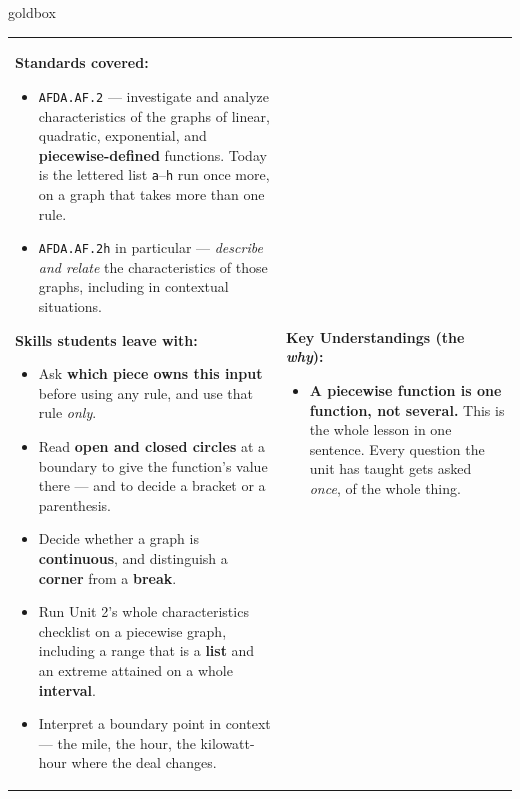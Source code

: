\documentclass[10pt]{article}
\begin{document}
\renewcommand{\arraystretch}{1.6}
\begin{skillbox}{goldbox}
\begin{tabularx}{\linewidth}{@{}X|X@{}}
\begin{minipage}[t]{\linewidth}\vspace{0pt}
\textbf{Standards covered:}
\begin{itemize}[leftmargin=1.1em, itemsep=2pt, topsep=2pt]
  \item \texttt{AFDA.AF.2} --- investigate and analyze characteristics of the graphs of linear,
        quadratic, exponential, and \textbf{piecewise-defined} functions. Today is the lettered list
        \texttt{a}--\texttt{h} run once more, on a graph that takes more than one rule.
  \item \texttt{AFDA.AF.2h} in particular --- \emph{describe and relate} the characteristics of those
        graphs, including in contextual situations.
\end{itemize}
\textbf{Skills students leave with:}
\begin{itemize}[leftmargin=1.1em, itemsep=2pt, topsep=2pt]
  \item Ask \textbf{which piece owns this input} before using any rule, and use that rule
        \emph{only}.
  \item Read \textbf{open and closed circles} at a boundary to give the function's value there ---
        and to decide a bracket or a parenthesis.
  \item Decide whether a graph is \textbf{continuous}, and distinguish a \textbf{corner} from a
        \textbf{break}.
  \item Run Unit 2's whole characteristics checklist on a piecewise graph, including a range that is
        a \textbf{list} and an extreme attained on a whole \textbf{interval}.
  \item Interpret a boundary point in context --- the mile, the hour, the kilowatt-hour where the
        deal changes.
\end{itemize}
\end{minipage}
&
\begin{minipage}[t]{\linewidth}\vspace{0pt}
\textbf{Key Understandings (the \emph{why}):}
\begin{itemize}[leftmargin=1.1em, itemsep=2pt, topsep=2pt]
  \item \textbf{A piecewise function is one function, not several.} This is the whole lesson in one
        sentence. Every question the unit has taught gets asked \emph{once}, of the whole thing.

\end{itemize}
\end{minipage}
\end{tabularx}
\end{skillbox}
\end{document}
